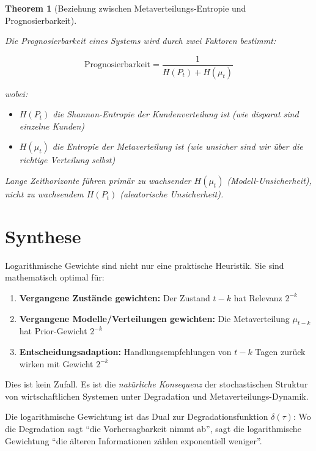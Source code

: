\documentclass[12pt, a4paper, titlepage]{report}
\newtheorem{theorem}{Theorem}[section]
\theoremstyle{definition}
\theoremstyle{remark}
\begin{document}
\begin{theorem}[Beziehung zwischen Metaverteilungs-Entropie und Prognosierbarkeit]
\label{thm:meta_entropy_predictability}

Die Prognosierbarkeit eines Systems wird durch zwei Faktoren bestimmt:

\begin{equation}
\text{Prognosierbarkeit} = \frac{1}{H(P_t) + H(\mu_t)}
\label{eq:total_predictability}
\end{equation}

wobei:
\begin{itemize}
  \item $H(P_t)$ die Shannon-Entropie der Kundenverteilung ist (wie disparat sind einzelne Kunden)
  \item $H(\mu_t)$ die Entropie der Metaverteilung ist (wie unsicher sind wir über die richtige Verteilung selbst)
\end{itemize}

Lange Zeithorizonte führen primär zu wachsender $H(\mu_t)$ (Modell-Unsicherheit), nicht zu wachsendem $H(P_t)$ (aleatorische Unsicherheit).
\end{theorem}

\section{Synthese}

Logarithmische Gewichte sind nicht nur eine praktische Heuristik. Sie sind mathematisch optimal für:

\begin{enumerate}
  \item \textbf{Vergangene Zustände gewichten:} Der Zustand $t-k$ hat Relevanz $2^{-k}$
  
  \item \textbf{Vergangene Modelle/Verteilungen gewichten:} Die Metaverteilung $\mu_{t-k}$ hat Prior-Gewicht $2^{-k}$
  
  \item \textbf{Entscheidungsadaption:} Handlungsempfehlungen von $t-k$ Tagen zurück wirken mit Gewicht $2^{-k}$
\end{enumerate}

Dies ist kein Zufall. Es ist die \emph{natürliche Konsequenz} der stochastischen Struktur von wirtschaftlichen Systemen unter Degradation und Metaverteilungs-Dynamik.

Die logarithmische Gewichtung ist das Dual zur Degradationsfunktion $\delta(\tau)$: Wo die Degradation sagt ``die Vorhersagbarkeit nimmt ab'', sagt die logarithmische Gewichtung ``die älteren Informationen zählen exponentiell weniger''.
\end{document}
